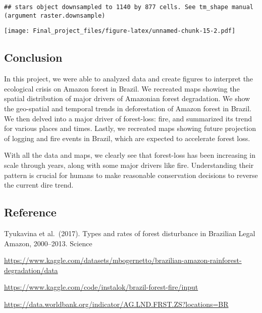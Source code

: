 \documentclass[
]{article}
\begin{document}
\begin{verbatim}
## stars object downsampled to 1140 by 877 cells. See tm_shape manual (argument raster.downsample)
\end{verbatim}

\texttt{[image: Final\_project\_files/figure-latex/unnamed-chunk-15-2.pdf]}

\hypertarget{conclusion}{%
\subsection{Conclusion}\label{conclusion}}

In this project, we were able to analyzed data and create figures to
interpret the ecological crisis on Amazon forest in Brazil. We recreated
maps showing the spatial distribution of major drivers of Amazonian
forest degradation. We show the geo-spatial and temporal trends in
deforestation of Amazon forest in Brazil. We then delved into a major
driver of forest-loss: fire, and summarized its trend for various places
and times. Lastly, we recreated maps showing future projection of
logging and fire events in Brazil, which are expected to accelerate
forest loss.

With all the data and maps, we clearly see that forest-loss has been
increasing in scale through years, along with some major drivers like
fire. Understanding their pattern is crucial for humans to make
reasonable conservation decisions to reverse the current dire trend.

\hypertarget{reference}{%
\subsection{Reference}\label{reference}}

Tyukavina et al.~(2017). Types and rates of forest disturbance in
Brazilian Legal Amazon, 2000--2013. Science

\url{https://www.kaggle.com/datasets/mbogernetto/brazilian-amazon-rainforest-degradation/data}

\url{https://www.kaggle.com/code/instalok/brazil-forest-fire/input}

\url{https://data.worldbank.org/indicator/AG.LND.FRST.ZS?locations=BR}
\end{document}
